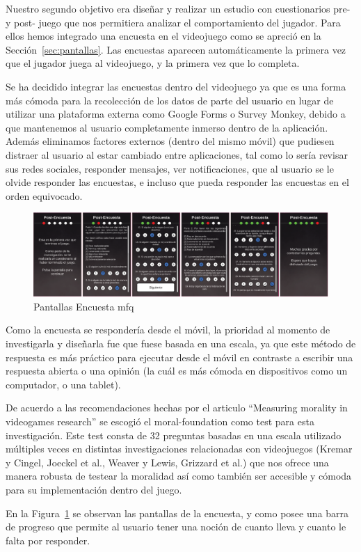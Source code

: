 Nuestro segundo objetivo era diseñar y realizar un estudio con cuestionarios pre- y post- juego que nos permitiera analizar el comportamiento del jugador. Para ellos hemos integrado una encuesta en el videojuego como se apreció en la Sección~\ref{sec:pantallas}.  Las encuestas aparecen automáticamente la primera vez que el jugador juega al videojuego, y la primera vez que lo completa.

Se ha decidido integrar las encuestas dentro del videojuego ya que es una forma más cómoda para la recolección de los datos de parte del usuario en lugar de utilizar una plataforma externa como Google Forms o Survey Monkey, debido a que mantenemos al usuario completamente inmerso dentro de la aplicación. Además eliminamos factores externos (dentro del mismo móvil) que pudiesen distraer al usuario al estar cambiado entre aplicaciones, tal como lo sería revisar sus redes sociales, responder mensajes, ver notificaciones, que al usuario se le olvide responder las encuestas, e incluso que pueda responder las encuestas en el orden equivocado.

\begin{figure}[h]
    \centering
    \includegraphics[width=\textwidth]{imgs/encuesta.png}
    \caption{Pantallas Encuesta \acrshort{mfq}}
    \label{fig:pantallas-encuesta}
\end{figure}

Como la encuesta se respondería desde el móvil, la prioridad al momento de investigarla y diseñarla fue que fuese basada en una escala, ya que este método de respuesta es más práctico para ejecutar desde el móvil en contraste a escribir una respuesta abierta o una opinión (la cuál es más cómoda en dispositivos como un computador, o una tablet).

De acuerdo a las recomendaciones hechas por el articulo ``Measuring morality in videogames research''\cite{measure-morality} se escogió el \gls{moral-foundation}\cite{moral-foundation} como test para esta investigación. Este test consta de 32 preguntas basadas en una escala utilizado múltiples veces en distintas investigaciones relacionadas con videojuegos (Kremar y Cingel\cite{kremar-cingel}, Joeckel et al.\cite{joeckel}, Weaver y Lewis\cite{weaver-lewis}, Grizzard et al.\cite{grizzard}) que nos ofrece una manera robusta de testear la moralidad así como también ser accesible y cómoda para su implementación dentro del juego.

En la Figura~\ref{fig:pantallas-encuesta} se observan las pantallas de la encuesta, y como posee una barra de progreso que permite al usuario tener una noción de cuanto lleva y cuanto le falta por responder.
